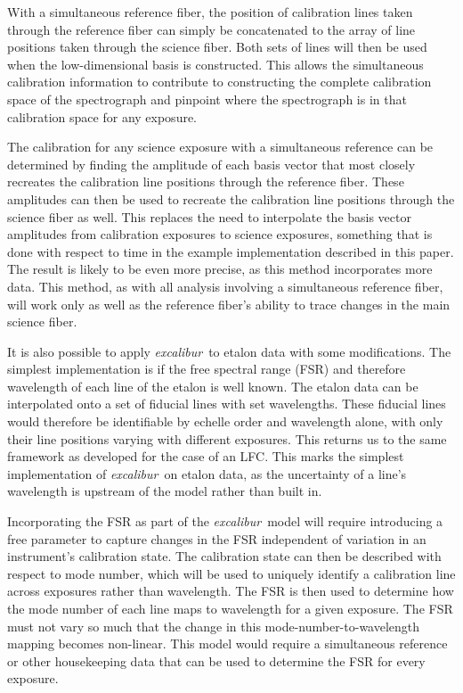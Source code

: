 \documentclass[twocolumn,table,xcolor,trackchanges]{aastex63}
\newcommand{\project}[1]{\textsl{#1}}
\newcommand{\name}{\project{excalibur}}
\begin{document}
With a simultaneous reference fiber, the position of calibration lines taken through the reference fiber can simply be concatenated to the array of line positions taken through the science fiber.  Both sets of lines will then be used when the low-dimensional basis is constructed.  This allows the simultaneous calibration information to contribute to constructing the complete calibration space of the spectrograph and pinpoint where the spectrograph is in that calibration space for any exposure.

The calibration for any science exposure with a simultaneous reference can be determined by finding the amplitude of each basis vector that most closely recreates the calibration line positions through the reference fiber.  These amplitudes can then be used to recreate the calibration line positions through the science fiber as well.  This replaces the need to interpolate the basis vector amplitudes from calibration exposures to science exposures, something that is done with respect to time in the example implementation described in this paper.  The result is likely to be even more precise, as this method incorporates more data.  This method, as with all analysis involving a simultaneous reference fiber, will work only as well as the reference fiber's ability to trace changes in the main science fiber.

It is also possible to apply \name\ to etalon data with some modifications.  The simplest implementation is if the free spectral range (FSR) and therefore wavelength of each line of the etalon is well known.  The etalon data can be interpolated onto a set of fiducial lines with set wavelengths.  These fiducial lines would therefore be identifiable by echelle order and wavelength alone, with only their line positions varying with different exposures.  This returns us to the same framework as developed for the case of an LFC.  This marks the simplest implementation of \name\ on etalon data, as the uncertainty of a line's wavelength is upstream of the model rather than built in.

Incorporating the FSR as part of the \name\ model will require introducing a free parameter to capture changes in the FSR independent of variation in an instrument's calibration state.  The calibration state can then be described with respect to mode number, which will be used to uniquely identify a calibration line across exposures rather than wavelength.  The FSR is then used to determine how the mode number of each line maps to wavelength for a given exposure.  The FSR must not vary so much that the change in this mode-number-to-wavelength mapping becomes non-linear.  This model would require a simultaneous reference or other housekeeping data that can be used to determine the FSR for every exposure.
\end{document}
